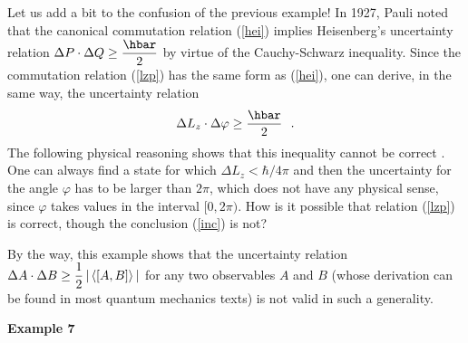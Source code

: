 \documentclass[12pt]{report}
\begin{document}
\medskip

Let us add a bit to the confusion of the previous example!
In 1927, Pauli noted that the 
canonical commutation relation (\ref{hei}) implies 
Heisenberg's uncertainty relation 
$\Delta P \cdot \Delta Q  \geq \ds{\hbar \over 2}$
by virtue of the Cauchy-Schwarz inequality.
Since the commutation relation (\ref{lzp}) has the same form as 
(\ref{hei}), one can derive, in the same way, the 
uncertainty relation 
\begin{equation}
\label{inc}
\Delta L_z \cdot \Delta \varphi \geq \ds{\hbar \over 2}
\ \ .
\end{equation}
The following physical reasoning shows that this inequality 
cannot be correct \cite{ju, car, gap}.
One can always find a state for which 
$\Delta L_z  < \hbar /  4\pi$
and then the uncertainty for the angle $\varphi$ has to be larger 
than $2 \pi$, which does not have any physical sense, since 
$\varphi$ takes values in the interval $[0,2 \pi )$.
How is it possible that relation (\ref{lzp}) is correct,
though the conclusion (\ref{inc}) is not?  

By the way, this example shows that the 
uncertainty relation 
$\Delta A\cdot \Delta B  \geq \displaystyle{1 \over 2} \,
| \, \langle [ A,B] \rangle \, |$ 
for any two observables $A$ and $B$ (whose derivation can be found 
in most quantum mechanics texts) is not valid in such a generality. 

 
\bigskip
 
\noindent 
{\bf Example 7}
 
\medskip
\end{document}
